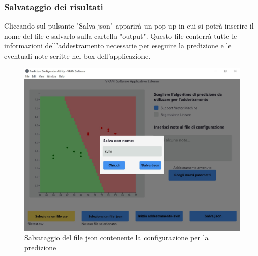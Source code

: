 		\subsubsection{Salvataggio dei risultati}
		Cliccando sul pulsante "Salva json" apparirà un pop-up in cui si potrà inserire il nome del file e salvarlo sulla cartella "output". Questo file conterrà tutte le informazioni dell'addestramento necessarie per eseguire la predizione e le eventuali note scritte nel box dell'applicazione.
		\mbox{}
		\begin{figure} [H]
			\begin{center}
				\includegraphics[width=\linewidth]{./img/5.jpg}
			\end{center}
			\caption{Salvataggio del file json contenente la configurazione per la predizione}
		\end{figure}
		\mbox{}
		
